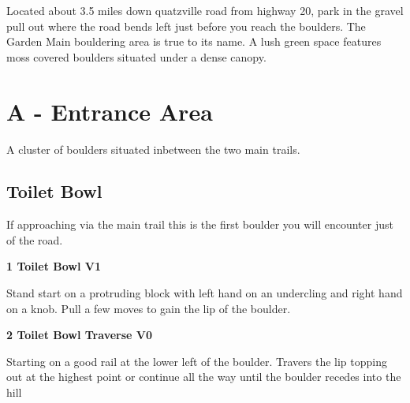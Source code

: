 \raggedcolumns
\begin{multicols}{2}

Located about 3.5 miles down quatzville road from highway 20, park in the gravel pull out where the road bends left just before you reach the boulders. The Garden Main bouldering area is true to its name. A lush green space features moss covered boulders situated under a dense canopy.\\


\newpage

		\section{A - Entrance Area}\label{sa:Entrance Area}
	A cluster of boulders situated inbetween the two main trails.\\

	
			\subsection*{Toilet Bowl}\label{bf:Toilet Bowl}
			If approaching via the main trail this is the first boulder you will encounter just of the road.\\
			

					\label{rt:Toilet Bowl}
\colorbox{green!20}{
\parbox{0.95\linewidth}{
\textbf{
1 Toilet Bowl V1   
}
}
}

					\begin{adjustwidth}{0.5cm}{}				
					Stand start on a protruding block with left hand on an undercling and right hand on a knob. Pull a few moves to gain the lip of the boulder.
					\end{adjustwidth}
					\label{rt:Toilet Bowl Traverse}
\colorbox{green!20}{
\parbox{0.95\linewidth}{
\textbf{
2 Toilet Bowl Traverse V0    
}
}
}

					\begin{adjustwidth}{0.5cm}{}				
					Starting on a good rail at the lower left of the boulder. Travers the lip topping out at the highest point or continue all the way until the boulder recedes into the hill
					\end{adjustwidth}


\end{multicols}
